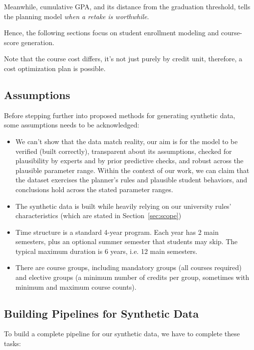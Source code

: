 \documentclass[10pt,a4paper]{article}
\begin{document}
Meanwhile, cumulative GPA, and its distance from the graduation threshold, tells the planning model \textit{when a retake is worthwhile}.

Hence, the following sections focus on student enrollment modeling and course-score generation.



Note that the course cost differs, it's not just purely by credit unit, therefore, a cost optimization plan is possible.


    \subsection{Assumptions}

Before stepping further into proposed methods for generating synthetic data, some assumptions needs to be acknowledged:
\begin{itemize}
    \item We can’t show that the data match reality, our aim is for the model to be verified (built correctly), transparent about its assumptions, checked for plausibility by experts and by prior predictive checks, and robust across the plausible parameter range. Within the context of our work, we can claim that the dataset exercises the planner’s rules and plausible student behaviors, and conclusions hold across the stated parameter ranges.

    \item The synthetic data is built while heavily relying on our university rules' characteristics (which are stated in Section~\ref{sec:scope})

    \item Time structure is a standard 4-year program. Each year has 2 main semesters, plus an optional summer semester that students may skip. The typical maximum duration is 6 years, i.e. 12 main semesters.

    \item There are course groups, including mandatory groups (all courses required) and elective groups (a minimum number of credits per group, sometimes with minimum and maximum course counts).

    
\end{itemize}

    \subsection{Building Pipelines for Synthetic Data}
To build a complete pipeline for our synthetic data, we have to complete these tasks:
\end{document}
